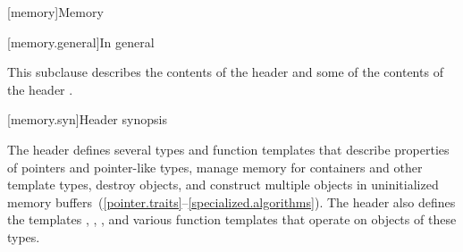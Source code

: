 [memory]{Memory}

[memory.general]{In general}

\pnum
This subclause describes the contents of the header
 and some
of the contents of the header .

[memory.syn]{Header  synopsis}

\pnum
The header  defines several types and function templates that
describe properties of pointers and pointer-like types, manage memory
for containers and other template types, destroy objects, and
construct multiple objects in
uninitialized memory
buffers~(\ref{pointer.traits}--\ref{specialized.algorithms}).
The header also defines the templates
, , , and various function
templates that operate on objects of these types.

